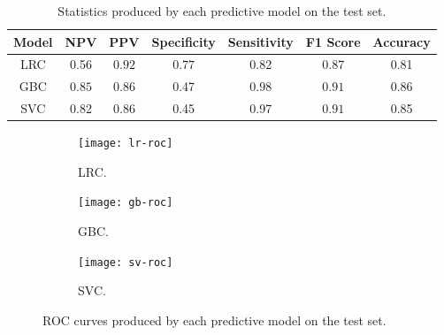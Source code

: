 \documentclass[twoside,11pt]{article}
\begin{document}
\begin{table}[!htb]
    \caption{Statistics produced by each predictive model on the test set.}
    \centering
    \begin{tabular}{|c|c|c|c|c|c|c|}
        \hline
        \textbf{Model} & \textbf{NPV} & \textbf{PPV} & \textbf{Specificity} & \textbf{Sensitivity} & \textbf{F1 Score} & \textbf{Accuracy} \\
        \hline
        LRC & 0.56 & $\mathbf{0.92}$ & $\mathbf{0.77}$ & 0.82 & 0.87 & 0.81 \\
        GBC & $\mathbf{0.85}$ & 0.86 & 0.47 & $\mathbf{0.98}$ & $\mathbf{0.91}$ & $\mathbf{0.86}$ \\
        SVC & 0.82 & 0.86 & 0.45 & 0.97 & $\mathbf{0.91}$ & 0.85 \\
        \hline
    \end{tabular}
\end{table}

\begin{figure}[h]
    \centering
    \begin{subfigure}[b]{0.3\textwidth}
        \centering
        \texttt{[image: lr-roc]}
        \caption{LRC.}
        \label{fig:lr-roc}
    \end{subfigure}
    \hfill
    \begin{subfigure}[b]{0.3\textwidth}
        \centering
        \texttt{[image: gb-roc]}
        \caption{GBC.}
        \label{fig:gb-roc}
    \end{subfigure}
    \hfill
    \begin{subfigure}[b]{0.3\textwidth}
        \centering
        \texttt{[image: sv-roc]}
        \caption{SVC.}
        \label{fig:sv-roc}
    \end{subfigure}
       \caption{ROC curves produced by each predictive model on the test set.}
       \label{fig:roc}
\end{figure}

\end{document}
